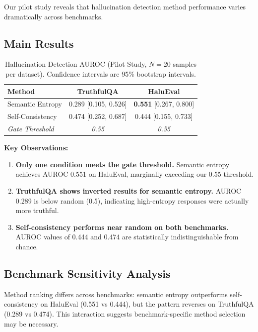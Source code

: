 Our pilot study reveals that hallucination detection method performance varies dramatically across benchmarks.

\subsection{Main Results}

\begin{table}[h]
\centering
\begin{tabular}{@{}lcc@{}}
\toprule
\textbf{Method} & \textbf{TruthfulQA} & \textbf{HaluEval} \\
\midrule
Semantic Entropy & 0.289 [0.105, 0.526] & \textbf{0.551} [0.267, 0.800] \\
Self-Consistency & 0.474 [0.252, 0.687] & 0.444 [0.155, 0.733] \\
\midrule
\emph{Gate Threshold} & \emph{0.55} & \emph{0.55} \\
\bottomrule
\end{tabular}
\caption{Hallucination Detection AUROC (Pilot Study, $N=20$ samples per dataset). Confidence intervals are 95\% bootstrap intervals.}
\label{tab:results}
\end{table}

\textbf{Key Observations:}

\begin{enumerate}
    \item \textbf{Only one condition meets the gate threshold.} Semantic entropy achieves AUROC 0.551 on HaluEval, marginally exceeding our 0.55 threshold.

    \item \textbf{TruthfulQA shows inverted results for semantic entropy.} AUROC 0.289 is below random (0.5), indicating high-entropy responses were actually more truthful.

    \item \textbf{Self-consistency performs near random on both benchmarks.} AUROC values of 0.444 and 0.474 are statistically indistinguishable from chance.
\end{enumerate}

\subsection{Benchmark Sensitivity Analysis}

Method ranking differs across benchmarks: semantic entropy outperforms self-consistency on HaluEval (0.551 vs 0.444), but the pattern reverses on TruthfulQA (0.289 vs 0.474). This interaction suggests benchmark-specific method selection may be necessary.

